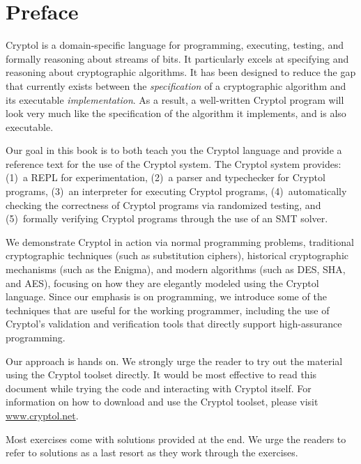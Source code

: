 \chapter*{Preface}

Cryptol is a domain-specific language for programming, executing,
testing, and formally reasoning about streams of bits.  It
particularly excels at specifying and reasoning about cryptographic
algorithms.  It has been designed to reduce the gap that currently
exists between the {\it specification} of a cryptographic algorithm
and its executable {\it implementation}.  As a result, a well-written
Cryptol program will look very much like the specification of the
algorithm it implements, and is also executable.  

Our goal in this book is to both teach you the Cryptol language and
provide a reference text for the use of the Cryptol system.  The
Cryptol system provides: (1)~a REPL for experimentation, (2)~a parser
and typechecker for Cryptol programs, (3)~an interpreter for executing
Cryptol programs, (4)~automatically checking the correctness of
Cryptol programs via randomized testing, and (5)~formally verifying
Cryptol programs through the use of an SMT solver.

We demonstrate Cryptol in action via normal programming problems,
traditional cryptographic techniques (such as substitution ciphers),
historical cryptographic mechanisms (such as the Enigma), and modern
algorithms (such as DES, SHA, and AES), focusing on how they are
elegantly modeled using the Cryptol language.  Since our emphasis is
on programming, we introduce some of the techniques that are useful
for the working programmer, including the use of Cryptol's validation
and verification tools that directly support high-assurance
programming.

Our approach is hands on.  We strongly urge the reader to try out the
material using the Cryptol toolset directly.  It would be most
effective to read this document while trying the code and interacting
with Cryptol itself.  For information on how to download and use the
Cryptol toolset, please visit \url{www.cryptol.net}.

Most exercises come with solutions provided at the end. We urge the
readers to refer to solutions as a last resort as they work through
the exercises.



